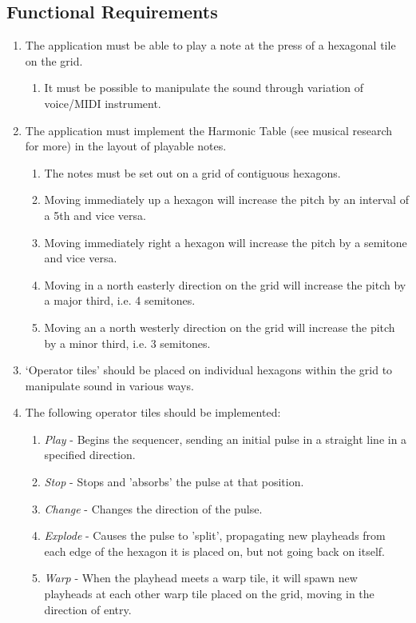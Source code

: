 \documentclass[10pt,a4paper]{article}
\begin{document}
\subsection{Functional Requirements}
\begin{enumerate}

\item The application must be able to play a note at the press of a hexagonal tile on the grid.
\begin{enumerate}
\item It must be possible to manipulate the sound through variation of voice/MIDI instrument.
\end{enumerate}

\item The application must implement the Harmonic Table (see musical research for more) in the layout of playable notes.
\begin{enumerate}
\item The notes must be set out on a grid of contiguous hexagons.
\item Moving immediately up a hexagon will increase the pitch by an interval of a 5th and vice versa.
\item Moving immediately right a hexagon will increase the pitch by a semitone and vice versa.
\item Moving in a north easterly direction on the grid will increase the pitch by a major third, i.e. 4 semitones.
\item Moving an a north westerly direction on the grid will increase the pitch by a minor third, i.e. 3 semitones.
\end{enumerate}

\item `Operator tiles' should be placed on individual hexagons within the grid to manipulate sound in various ways.

\item The following operator tiles should be implemented:
\begin{enumerate}
\item \textit{Play} - Begins the sequencer, sending an initial pulse in a straight line in a specified direction.
\item \textit{Stop} - Stops and 'absorbs' the pulse at that position.
\item \textit{Change} - Changes the direction of the pulse.
\item \textit{Explode} - Causes the pulse to 'split', propagating new playheads from each edge of the hexagon it is placed on, but not going back on itself.
\item \textit{Warp} - When the playhead meets a warp tile, it will spawn new playheads at each other warp tile placed on the grid, moving in the direction of entry. 
\end{enumerate}


\end{enumerate}
\end{document}
